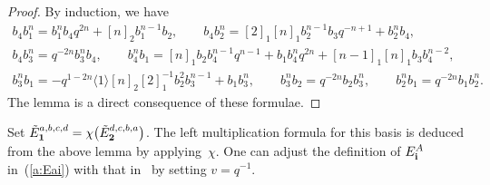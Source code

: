 \documentclass[11pt]{article}
\def\qmq#1{\langle #1 \rangle}
\begin{document}
\begin{proof}
 By induction, we have
\begin{gather*}
 {b_4 b_1^n} = {b_1^n b_4} q^{2 n}+[n]_2 {b_1^{n-1}b_2},\qquad
 {b_4 b_2^n} = [2]_1 [n]_1 {b_2^{n-1} b_3} q^{-n+1}+{b_2^n b_4},\\
 {b_4 b_3^n} = q^{-2 n} {b_3^n b_4},\qquad
 {b_4^n b_1} = [n]_1 {b_2 b_4^{n-1}} q^{n-1}+{b_1 b_4^n} q^{2 n}+[n-1]_1 [n]_1 {b_3 b_4^{n-2}},\\
 {b_3^n b_1} = -q^{1-2 n}\qmq{1} [n]_2 [2]_1^{-1} {b_2^2 b_3^{n-1}}+{b_1 b_3^n},\qquad
 {b_3^n b_2} = q^{-2 n} {b_2 b_3^n},\qquad
 {b_2^n b_1} = q^{-2 n} {b_1 b_2^n}.
 \end{gather*}
The lemma is a direct consequence of these formulae.
\end{proof}

Set ${\tilde E}_{\bf 1}^{a,b,c,d} = \chi\big({\tilde E}^{d,c,b,a}_{\bf 2}\big)$.
The left multiplication formula for this basis is deduced from
the above lemma by applying~$\chi$.
One can adjust the def\/inition of
$E^A_{\bf i}$ in~(\ref{a:Eai}) with that in~\cite{Xi} by setting $v=q^{-1}$.
\end{document}
